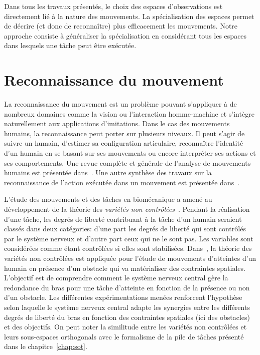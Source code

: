 Dans tous les travaux présentés, le choix des espaces d'observations est directement lié
à la nature des mouvements. La spécialisation des espaces permet 
de décrire (et donc de reconnaître) plus efficacement les mouvements.
Notre approche consiste à généraliser la spécialisation 
en considérant tous les espaces dans lesquels une t\^ache
peut être exécutée.

\section{Reconnaissance du mouvement}
La reconnaissance du mouvement est un problème pouvant s'appliquer à de nombreux domaines
comme la vision ou l'interaction homme-machine et s'intègre naturellement aux applications d'imitations.
Dans le cas des mouvements humains, la reconnaissance peut porter sur plusieurs niveaux. 
Il peut s'agir de suivre un humain, d'estimer sa configuration articulaire,
reconnaître l'identité d'un humain en se basant sur ses mouvements ou encore interpréter 
ses actions et ses comportements.
Une revue complète et générale de l'analyse de mouvements
humains est présentée dans~\cite{moeslund06}.
Une autre synthèse des travaux sur la reconnaissance de l'action
exécutée dans un mouvement est présentée dans~\cite{krueger07}.

L'étude des mouvements et des t\^aches en biomécanique a amené au développement 
de la théorie des \emph{variétés non contrôlées}~\cite{scholz99}.
Pendant la réalisation d'une t\^ache, les degrés de liberté contribuant à la t\^ache d'un humain
seraient classés dans deux catégories: d'une part les degrés de liberté 
qui sont contrôlés par le système nerveux et d'autre part ceux qui ne le sont pas.
Les variables sont considérées comme étant contrôlées si elles sont stabilisées.
Dans~\cite{jacquierbret09}, la théorie des variétés non contrôlées est appliquée
pour l'étude de mouvements d'atteintes d'un humain en présence d'un obstacle qui va
matérialiser des contraintes spatiales.
L'objectif est de comprendre comment le système nerveux central gère la redondance du bras pour une t\^ache 
d'atteinte en fonction de la présence ou non d'un obstacle. Les différentes 
expérimentations menées renforcent l'hypothèse selon laquelle le système nerveux central
adapte les synergies entre les différents degrés de liberté du bras en fonction
des contraintes spatiales (ici des obstacles) et des objectifs.
On peut noter la similitude entre les variétés non contrôlées et leurs sous-espaces
orthogonals avec le formalisme de la pile de t\^aches présenté dans le chapitre~\ref{chap:sot}. 

